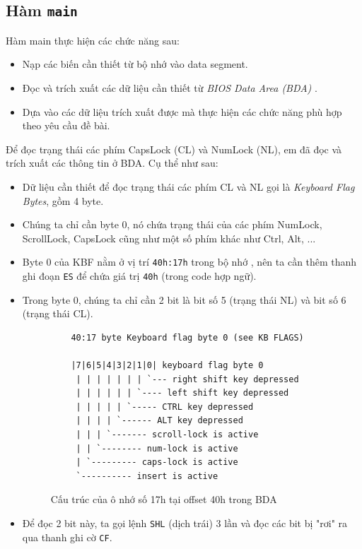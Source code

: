 \documentclass[12pt, final]{article}
\newcommand{\code}[1]{\texttt{#1}}
\begin{document}
\subsection{Hàm \texttt{main}}
Hàm main thực hiện các chức năng sau:
\begin{itemize}
    \item Nạp các biến cần thiết từ bộ nhớ vào data segment.
    \item Đọc và trích xuất các dữ liệu cần thiết từ \textit{BIOS Data Area (BDA)} \cite{bda}.
    \item Dựa vào các dữ liệu trích xuất được mà thực hiện các chức năng phù hợp theo yêu cầu đề bài.
\end{itemize}
Để đọc trạng thái các phím CapsLock (CL) và NumLock (NL), em đã đọc và trích xuất các thông tin ở BDA. Cụ thể như sau:
\begin{itemize}
    \item Dữ liệu cần thiết để đọc trạng thái các phím CL và NL gọi là \textit{Keyboard Flag Bytes}, gồm 4 byte.
    \item Chúng ta chỉ cần byte 0, nó chứa trạng thái của các phím NumLock, ScrollLock, CapsLock cũng như một số phím khác như Ctrl, Alt, ...
    \item Byte 0 của KBF nằm ở vị trí \texttt{40h:17h} trong bộ nhớ \cite{bda}, nên ta cần thêm thanh ghi đoạn \texttt{ES} để chứa giá trị \texttt{40h} (trong code hợp ngữ).
    \item Trong byte 0, chúng ta chỉ cần 2 bit là bit số 5 (trạng thái NL) và bit số 6 (trạng thái CL). 
    \begin{figure}[H]
        \centering
                \begin{verbatim}
    40:17 byte Keyboard flag byte 0 (see KB FLAGS)
            
    |7|6|5|4|3|2|1|0| keyboard flag byte 0
     | | | | | | | `--- right shift key depressed
     | | | | | | `---- left shift key depressed
     | | | | | `----- CTRL key depressed
     | | | | `------ ALT key depressed
     | | | `------- scroll-lock is active
     | | `-------- num-lock is active
     | `--------- caps-lock is active
     `---------- insert is active
        \end{verbatim}
        \caption{Cấu trúc của ô nhớ số 17h tại offset 40h trong BDA \cite{bda}}
    \end{figure}
    \item Để đọc 2 bit này, ta gọi lệnh \texttt{SHL} (dịch trái) 3 lần và đọc các bit bị "rơi" ra qua thanh ghi cờ \code{CF}.
\end{itemize}
\end{document}
